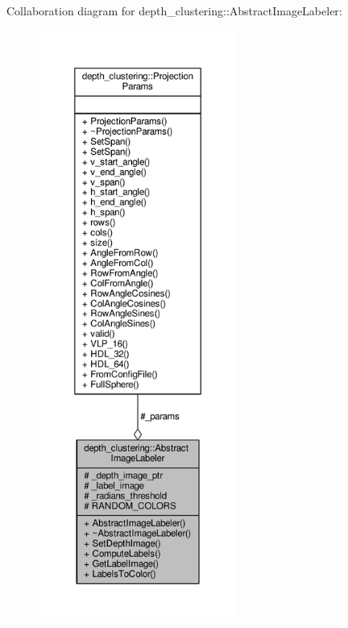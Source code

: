 Collaboration diagram for depth\-\_\-clustering\-:\-:Abstract\-Image\-Labeler\-:
\nopagebreak
\begin{figure}[H]
\begin{center}
\leavevmode
\includegraphics[height=550pt]{classdepth__clustering_1_1AbstractImageLabeler__coll__graph}
\end{center}
\end{figure}


